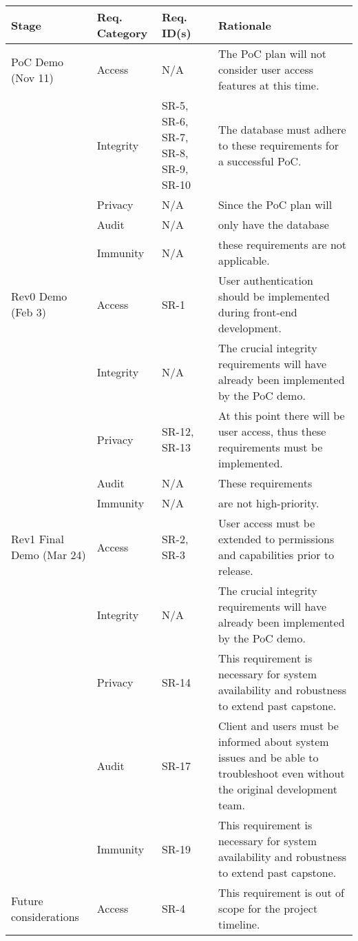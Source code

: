 \documentclass{article}
\begin{document}
\begin{longtable}[c]{|m{2cm}|m{2.6cm}|m{2cm}|m{3.8cm}|}
    \hline
    \textbf{Stage} & \textbf{Req. Category} & \textbf{Req. ID(s)} & \textbf{Rationale} \\
    \hline
    \endhead
    PoC Demo (Nov 11) & Access & N/A & The PoC plan will not consider user access features at this time.\\
    \cline{2-4}
    & Integrity & SR-5, SR-6, SR-7, SR-8, SR-9, SR-10 & The database must adhere to these requirements for a successful PoC.\\
    \cline{2-4}
    & Privacy & N/A & Since the PoC plan will\\
    & Audit & N/A & only have the database\\
    & Immunity & N/A & these requirements are not applicable.\\
    \hline
    Rev0 Demo (Feb 3) & Access & SR-1 & User authentication should be implemented during front-end development.\\
    \cline{2-4}
    & Integrity & N/A & The crucial integrity requirements will have already been implemented by the PoC demo.\\
    \cline{2-4}
    & Privacy & SR-12, SR-13 & At this point there will be user access, thus these requirements must be implemented.\\
    \cline{2-4}
    & Audit & N/A & These requirements\\
    & Immunity & N/A & are not high-priority.\\
    \hline
    Rev1 Final Demo (Mar 24) & Access & SR-2, SR-3 & User access must be extended to permissions and capabilities prior to release.\\
    \cline{2-4}
    & Integrity & N/A & The crucial integrity requirements will have already been implemented by the PoC demo.\\
    \cline{2-4}
    & Privacy & SR-14 & This requirement is necessary for system availability and robustness to extend past capstone.\\
    \cline{2-4}
    & Audit & SR-17 & Client and users must be informed about system issues and be able to troubleshoot even without the original development team.\\
    \cline{2-4}
    & Immunity & SR-19 & This requirement is necessary for system availability and robustness to extend past capstone.\\
    \hline
    Future considerations & Access & SR-4 & This requirement is out of scope for the project timeline.\\

\end{longtable}
\end{document}

